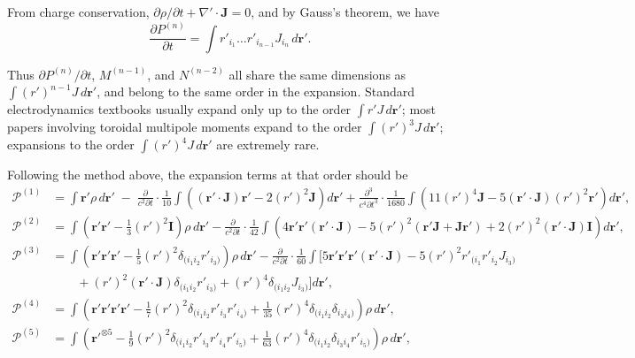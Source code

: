 \documentclass{article}
\begin{document}
	From charge conservation, $\partial \rho/\partial t + \nabla' \cdot \bm{J} = 0$, and by Gauss's theorem, we have
	\[
	\frac{\partial P^{(n)}}{\partial t} = \int r'_{i_1} \dots r'_{i_{n-1}} J_{i_n} \, d\bm{r}'.
	\]
	
	Thus $\partial P^{(n)}/\partial t$, $M^{(n-1)}$, and $N^{(n-2)}$ all share the same dimensions as $\int (r')^{n-1} J\, d\bm{r}'$, and belong to the same order in the expansion. Standard electrodynamics textbooks usually expand only up to the order $\int r' J\, d\bm{r}'$; most papers involving toroidal multipole moments expand to the order $\int (r')^3 J\, d\bm{r}'$; expansions to the order $\int (r')^4 J\, d\bm{r}'$ are extremely rare.
	
	Following the method above, the expansion terms at that order should be
	\[
	\begin{split}
		\bm{\mathcal{P}}^{(1)} &= \int \bm{r}' \rho \, d\bm{r}' \;-\; \frac{\partial}{c^2 \partial t} \cdot \frac{1}{10} \int \!\left( (\bm{r}' \cdot \bm{J}) \bm{r}' - 2 (r')^2 \bm{J} \right) d\bm{r}'
		+ \frac{\partial^3}{c^4 \partial t^3} \cdot \frac{1}{1680} \int \!\left( 11 (r')^4 \bm{J} - 5 (\bm{r}' \cdot \bm{J}) (r')^2 \bm{r}' \right) d\bm{r}', \\
		\bm{\mathcal{P}}^{(2)} &= \int \!\left( \bm{r}' \bm{r}' - \frac{1}{3} (r')^2 \bm{I} \right) \rho \, d\bm{r}'
		- \frac{\partial}{c^2 \partial t} \cdot \frac{1}{42} \int \!\left( 4 \bm{r}' \bm{r}' (\bm{r}' \cdot \bm{J}) - 5 (r')^2 (\bm{r}' \bm{J} + \bm{J} \bm{r}')
		+ 2 (r')^2 (\bm{r}' \cdot \bm{J}) \bm{I} \right) d\bm{r}', \\
		\bm{\mathcal{P}}^{(3)} &= \int \!\left( \bm{r}' \bm{r}' \bm{r}' - \frac{1}{5} (r')^2 \delta_{(i_1 i_2} r'_{i_3)} \right) \rho \, d\bm{r}'
		- \frac{\partial}{c^2 \partial t} \cdot \frac{1}{60} \int \Bigg[ 5 \bm{r}' \bm{r}' \bm{r}' (\bm{r}' \cdot \bm{J})
		- 5 (r')^2 r'_{(i_1} r'_{i_2} J_{i_3)} \\
		&\qquad+ (r')^2 (\bm{r}' \cdot \bm{J}) \delta_{(i_1 i_2} r'_{i_3)}
		+ (r')^4 \delta_{(i_1 i_2} J_{i_3)} \Bigg] d\bm{r}', \\
		\bm{\mathcal{P}}^{(4)} &= \int \!\left( \bm{r}' \bm{r}' \bm{r}' \bm{r}' - \frac{1}{7} (r')^2 \delta_{(i_1 i_2} r'_{i_3} r'_{i_4)}
		+ \frac{1}{35} (r')^4 \delta_{(i_1 i_2} \delta_{i_3 i_4)} \right) \rho \, d\bm{r}', \\
		\bm{\mathcal{P}}^{(5)} &= \int \!\left( \bm{r}'^{\otimes 5} - \frac{1}{9} (r')^2 \delta_{(i_1 i_2} r'_{i_3} r'_{i_4} r'_{i_5)}
		+ \frac{1}{63} (r')^4 \delta_{(i_1 i_2} \delta_{i_3 i_4} r'_{i_5)} \right) \rho \, d\bm{r}', \\

\end{split}\]
\end{document}
